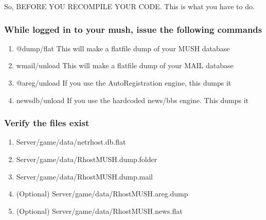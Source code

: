 \documentclass[letterpaper,10pt,english]{sphinxmanual}
\begin{document}
\sphinxAtStartPar
So, BEFORE YOU RECOMPILE YOUR CODE.  This is what you have to do.


\subsubsection{While logged in to your mush, issue the following commands}
\label{\detokenize{legacy:while-logged-in-to-your-mush-issue-the-following-commands}}\begin{enumerate}
%
\item {} 
\sphinxAtStartPar
@dump/flat    \sphinxhyphen{}\sphinxhyphen{} This will make a flatfile dump of your MUSH database

\item {} 
\sphinxAtStartPar
wmail/unload  \sphinxhyphen{}\sphinxhyphen{} This will make a flatfile dump of your MAIL database

\item {} 
\sphinxAtStartPar
@areg/unload  \sphinxhyphen{}\sphinxhyphen{} If you use the AutoRegistration engine, this dumps it

\item {} 
\sphinxAtStartPar
newsdb/unload \sphinxhyphen{}\sphinxhyphen{} If you use the hardcoded news/bbs engine.  This dumps it

\end{enumerate}


\subsubsection{Verify the files exist}
\label{\detokenize{legacy:verify-the-files-exist}}\begin{enumerate}
%
\item {} 
\sphinxAtStartPar
Server/game/data/netrhost.db.flat

\item {} 
\sphinxAtStartPar
Server/game/data/RhostMUSH.dump.folder

\item {} 
\sphinxAtStartPar
Server/game/data/RhostMUSH.dump.mail

\item {} 
\sphinxAtStartPar
(Optional) Server/game/data/RhostMUSH.areg.dump

\item {} 
\sphinxAtStartPar
(Optional) Server/game/data/RhostMUSH.news.flat

\end{enumerate}
\end{document}
